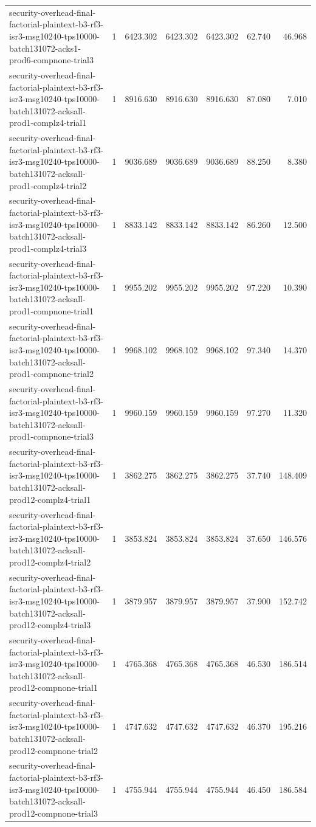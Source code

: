 \begin{tabular}{lrrrrrr}
security-overhead-final-factorial-plaintext-b3-rf3-isr3-msg10240-tps10000-batch131072-acks1-prod6-compnone-trial3 & 1 & 6423.302 & 6423.302 & 6423.302 & 62.740 & 46.968 \\
security-overhead-final-factorial-plaintext-b3-rf3-isr3-msg10240-tps10000-batch131072-acksall-prod1-complz4-trial1 & 1 & 8916.630 & 8916.630 & 8916.630 & 87.080 & 7.010 \\
security-overhead-final-factorial-plaintext-b3-rf3-isr3-msg10240-tps10000-batch131072-acksall-prod1-complz4-trial2 & 1 & 9036.689 & 9036.689 & 9036.689 & 88.250 & 8.380 \\
security-overhead-final-factorial-plaintext-b3-rf3-isr3-msg10240-tps10000-batch131072-acksall-prod1-complz4-trial3 & 1 & 8833.142 & 8833.142 & 8833.142 & 86.260 & 12.500 \\
security-overhead-final-factorial-plaintext-b3-rf3-isr3-msg10240-tps10000-batch131072-acksall-prod1-compnone-trial1 & 1 & 9955.202 & 9955.202 & 9955.202 & 97.220 & 10.390 \\
security-overhead-final-factorial-plaintext-b3-rf3-isr3-msg10240-tps10000-batch131072-acksall-prod1-compnone-trial2 & 1 & 9968.102 & 9968.102 & 9968.102 & 97.340 & 14.370 \\
security-overhead-final-factorial-plaintext-b3-rf3-isr3-msg10240-tps10000-batch131072-acksall-prod1-compnone-trial3 & 1 & 9960.159 & 9960.159 & 9960.159 & 97.270 & 11.320 \\
security-overhead-final-factorial-plaintext-b3-rf3-isr3-msg10240-tps10000-batch131072-acksall-prod12-complz4-trial1 & 1 & 3862.275 & 3862.275 & 3862.275 & 37.740 & 148.409 \\
security-overhead-final-factorial-plaintext-b3-rf3-isr3-msg10240-tps10000-batch131072-acksall-prod12-complz4-trial2 & 1 & 3853.824 & 3853.824 & 3853.824 & 37.650 & 146.576 \\
security-overhead-final-factorial-plaintext-b3-rf3-isr3-msg10240-tps10000-batch131072-acksall-prod12-complz4-trial3 & 1 & 3879.957 & 3879.957 & 3879.957 & 37.900 & 152.742 \\
security-overhead-final-factorial-plaintext-b3-rf3-isr3-msg10240-tps10000-batch131072-acksall-prod12-compnone-trial1 & 1 & 4765.368 & 4765.368 & 4765.368 & 46.530 & 186.514 \\
security-overhead-final-factorial-plaintext-b3-rf3-isr3-msg10240-tps10000-batch131072-acksall-prod12-compnone-trial2 & 1 & 4747.632 & 4747.632 & 4747.632 & 46.370 & 195.216 \\
security-overhead-final-factorial-plaintext-b3-rf3-isr3-msg10240-tps10000-batch131072-acksall-prod12-compnone-trial3 & 1 & 4755.944 & 4755.944 & 4755.944 & 46.450 & 186.584 \\

\end{tabular}
